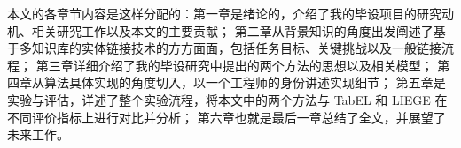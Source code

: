 本文的各章节内容是这样分配的：第一章是绪论的，介绍了我的毕设项目的研究动机、相关研究工作以及本文的主要贡献；
第二章从背景知识的角度出发阐述了基于多知识库的实体链接技术的方方面面，包括任务目标、关键挑战以及一般链接流程；
第三章详细介绍了我的毕设研究中提出的两个方法的思想以及相关模型；
第四章从算法具体实现的角度切入，以一个工程师的身份讲述实现细节；
第五章是实验与评估，详述了整个实验流程，将本文中的两个方法与 TabEL\cite{bhagavatula2015tabel} 和 LIEGE\cite{shen2012liege} 在不同评价指标上进行对比并分析；
第六章也就是最后一章总结了全文，并展望了未来工作。












